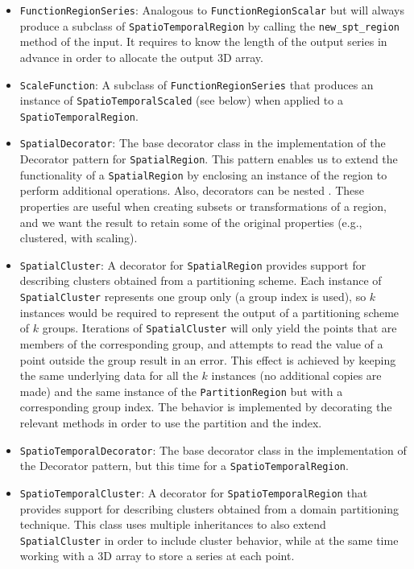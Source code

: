 \begin{itemize}
	\item \texttt{FunctionRegionSeries}: Analogous to \texttt{FunctionRegionScalar} but will always produce a subclass of \texttt{SpatioTemporalRegion} by calling the \texttt{new\_spt\_region} method of the input. It requires to know the length of the output series in advance in order to allocate the output 3D array.
	
	\item \texttt{ScaleFunction}: A subclass of \texttt{FunctionRegionSeries} that produces an instance of \texttt{SpatioTemporalScaled} (see below) when applied to a \texttt{SpatioTemporalRegion}.
	
	\item \texttt{SpatialDecorator}: The base decorator class in the implementation of the Decorator pattern for \texttt{SpatialRegion}. This pattern enables us to extend the functionality of a \texttt{SpatialRegion} by enclosing an instance of the region to perform additional operations. Also, decorators can be nested \cite{Gamma1994}. These properties are useful when creating subsets or transformations of a region, and we want the result to retain some of the original properties (e.g., clustered, with scaling).
	
	\item \texttt{SpatialCluster}: A decorator for \texttt{SpatialRegion} provides support for describing clusters obtained from a partitioning scheme. Each instance of \texttt{SpatialCluster} represents one group only (a group index is used), so $k$ instances would be required to represent the output of a partitioning scheme of $k$ groups. Iterations of \texttt{SpatialCluster} will only yield the points that are members of the corresponding group, and attempts to read the value of a point outside the group result in an error. This effect is achieved by keeping the same underlying data for all the $k$ instances (no additional copies are made) and the same instance of the  \texttt{PartitionRegion} but with a corresponding group index. The behavior is implemented by decorating the relevant methods in order to use the partition and the index.
	
	\item \texttt{SpatioTemporalDecorator}: The base decorator class in the implementation of the Decorator pattern, but this time for a \texttt{SpatioTemporalRegion}.
	
	\item \texttt{SpatioTemporalCluster}: A decorator for \texttt{SpatioTemporalRegion} that provides support for describing clusters obtained from a domain partitioning technique. This class uses multiple inheritances to also extend \texttt{SpatialCluster} in order to include cluster behavior, while at the same time working with a 3D array to store a series at each point.
	

\end{itemize}
